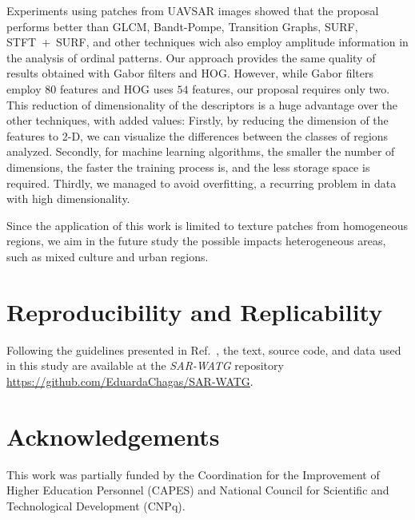 \documentclass[journal]{IEEEtran}
\begin{document}
Experiments using patches from UAVSAR images showed that the proposal performs better than GLCM, Bandt-Pompe, Transition Graphs, SURF, \mbox{STFT + SURF}, and other techniques wich also employ amplitude information in the analysis of ordinal patterns. 
Our approach provides the same quality of results obtained with Gabor filters and HOG.
However, while Gabor filters employ $80$ features and HOG uses $54$ features, our proposal requires only two.
This reduction of dimensionality of the descriptors is a huge advantage over the other techniques, with added values:
Firstly, by reducing the dimension of the features to \mbox{2-D}, we can  visualize the differences between the classes of regions analyzed.
Secondly, for machine learning algorithms, the smaller the number of dimensions, the faster the training process is, and the less storage space is required.
Thirdly, we managed to avoid overfitting, a recurring problem in data with high dimensionality.

Since the application of this work is limited to texture patches from homogeneous regions, we aim in the future study the possible impacts heterogeneous areas, such as mixed culture and urban regions.

\section{Reproducibility and Replicability} 

Following the guidelines presented in Ref.~\cite{ABadgingSystemforReproducibilityandReplicabilityinRemoteSensingResearch}, the text, source code, and data used in this study are available at the \textit{SAR-WATG} repository \url{https://github.com/EduardaChagas/SAR-WATG}.




\section*{Acknowledgements}\label{ACKNOWLEDGEMENTS}

This work was partially funded by the Coordination for the Improvement of Higher Education Personnel (CAPES) and National Council for Scientific and Technological Development (CNPq).
\end{document}
